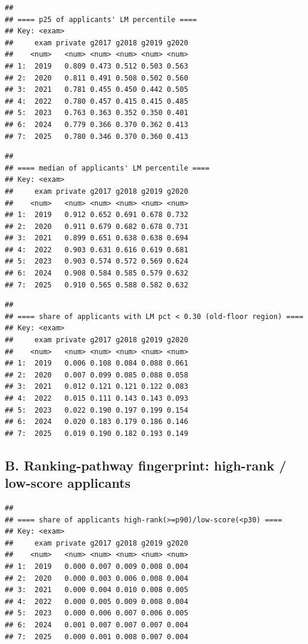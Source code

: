 \documentclass[
]{article}
\begin{document}
\begin{verbatim}
## 
## ==== p25 of applicants' LM percentile ====
## Key: <exam>
##     exam private g2017 g2018 g2019 g2020
##    <num>   <num> <num> <num> <num> <num>
## 1:  2019   0.809 0.473 0.512 0.503 0.563
## 2:  2020   0.811 0.491 0.508 0.502 0.560
## 3:  2021   0.781 0.455 0.450 0.442 0.505
## 4:  2022   0.780 0.457 0.415 0.415 0.485
## 5:  2023   0.763 0.363 0.352 0.350 0.401
## 6:  2024   0.779 0.366 0.370 0.362 0.413
## 7:  2025   0.780 0.346 0.370 0.360 0.413
\end{verbatim}

\begin{verbatim}
## 
## ==== median of applicants' LM percentile ====
## Key: <exam>
##     exam private g2017 g2018 g2019 g2020
##    <num>   <num> <num> <num> <num> <num>
## 1:  2019   0.912 0.652 0.691 0.678 0.732
## 2:  2020   0.911 0.679 0.682 0.678 0.731
## 3:  2021   0.899 0.651 0.638 0.638 0.694
## 4:  2022   0.903 0.631 0.616 0.619 0.681
## 5:  2023   0.903 0.574 0.572 0.569 0.624
## 6:  2024   0.908 0.584 0.585 0.579 0.632
## 7:  2025   0.910 0.565 0.588 0.582 0.632
\end{verbatim}

\begin{verbatim}
## 
## ==== share of applicants with LM pct < 0.30 (old-floor region) ====
## Key: <exam>
##     exam private g2017 g2018 g2019 g2020
##    <num>   <num> <num> <num> <num> <num>
## 1:  2019   0.006 0.108 0.084 0.088 0.061
## 2:  2020   0.007 0.099 0.085 0.088 0.058
## 3:  2021   0.012 0.121 0.121 0.122 0.083
## 4:  2022   0.015 0.111 0.143 0.143 0.093
## 5:  2023   0.022 0.190 0.197 0.199 0.154
## 6:  2024   0.020 0.183 0.179 0.186 0.146
## 7:  2025   0.019 0.190 0.182 0.193 0.149
\end{verbatim}

\hypertarget{b.-ranking-pathway-fingerprint-high-rank-low-score-applicants}{%
\subsection{B. Ranking-pathway fingerprint: high-rank / low-score
applicants}\label{b.-ranking-pathway-fingerprint-high-rank-low-score-applicants}}

\begin{verbatim}
## 
## ==== share of applicants high-rank(>=p90)/low-score(<p30) ====
## Key: <exam>
##     exam private g2017 g2018 g2019 g2020
##    <num>   <num> <num> <num> <num> <num>
## 1:  2019   0.000 0.007 0.009 0.008 0.004
## 2:  2020   0.000 0.003 0.006 0.008 0.004
## 3:  2021   0.000 0.004 0.010 0.008 0.005
## 4:  2022   0.000 0.005 0.009 0.008 0.004
## 5:  2023   0.000 0.006 0.007 0.006 0.005
## 6:  2024   0.001 0.007 0.007 0.007 0.004
## 7:  2025   0.000 0.001 0.008 0.007 0.004
\end{verbatim}
\end{document}
